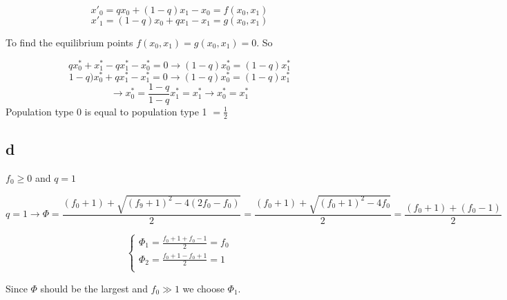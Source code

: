                      
\[  x'_0 = qx_0 + (1-q)x_1 -x_0 = f(x_{0}, x_1)\]
\[  x'_1 = (1-q)x_0+qx_1-x_1 = g(x_0,x_1)\]


To find the equilibrium points $f(x_0,x_1) = g(x_0, x_1) = 0$. So

\[ qx^*_0 + x^*_1 -qx^*_1 - x^*_0 = 0 \rightarrow (1-q)x^*_0 = (1-q)x^*_1\]
\[ 1-q)x^*_0+qx^*_1-x^*_1 = 0 \rightarrow (1-q)x^*_0 = (1-q)x^*_1\]
\[ \rightarrow x^*_0 = \frac{1-q}{1-q}x^*_1 = x^*_1 \rightarrow x^*_0 = x^*_1\]
Population type 0 is equal to population type 1 $= \frac{1}{2}$

\subsection{d}

$f_0 \geq 0$ and $q=1$

\[q=1 \rightarrow \varPhi =  \frac{(f_0+1) + \sqrt{(f_9+1)^2 -4(2f_0-f_0)}}{2} = \frac{(f_0+1)+\sqrt{(f_0+1)^2-4f_0}}{2} = \frac{(f_0+1) + (f_0-1)}{2} \]

\[ \left\{ \begin{array}{l}
         \varPhi_1 = \frac{f_0+1+f_0 -1}{2} = f_0\\
         \varPhi_2 =\frac{f_0+1-f_0+1}{2} = 1 \\
       \end{array} \right. \] 
       
Since $\varPhi$ should be the largest and $f_0 \gg 1 $ we choose $\varPhi_1$.


